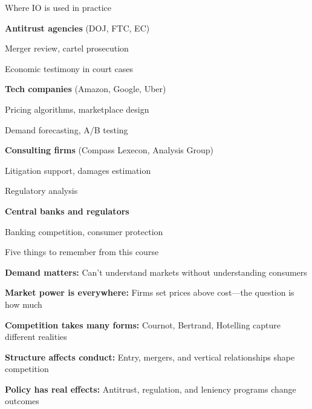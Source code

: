 \documentclass[notes,11pt, aspectratio=169]{beamer}
\newenvironment{wideitemize}{\itemize\addtolength{\itemsep}{10pt}}{\enditemize}
\newenvironment{wideenumerate}{\enumerate\addtolength{\itemsep}{10pt}}{\endenumerate}
\begin{document}
\begin{frame}{Where IO is used in practice}
	\begin{wideitemize}
		\item \textbf{Antitrust agencies} (DOJ, FTC, EC)
		\begin{wideitemize}
			\vspace{3pt}
			\item Merger review, cartel prosecution
			\item Economic testimony in court cases
		\end{wideitemize}
		\item \textbf{Tech companies} (Amazon, Google, Uber)
		\begin{wideitemize}
			\vspace{3pt}
			\item Pricing algorithms, marketplace design
			\item Demand forecasting, A/B testing
		\end{wideitemize}
		\item \textbf{Consulting firms} (Compass Lexecon, Analysis Group)
		\begin{wideitemize}
			\vspace{3pt}
			\item Litigation support, damages estimation
			\item Regulatory analysis
		\end{wideitemize}
		\item \textbf{Central banks and regulators}
		\begin{wideitemize}
			\vspace{3pt}
			\item Banking competition, consumer protection
		\end{wideitemize}
	\end{wideitemize}
\end{frame}

\begin{frame}{Five things to remember from this course}
	\begin{wideenumerate}
		\item \textbf{Demand matters:} Can't understand markets without understanding consumers
		\item \textbf{Market power is everywhere:} Firms set prices above cost---the question is how much
		\item \textbf{Competition takes many forms:} Cournot, Bertrand, Hotelling capture different realities
		\item \textbf{Structure affects conduct:} Entry, mergers, and vertical relationships shape competition
		\item \textbf{Policy has real effects:} Antitrust, regulation, and leniency programs change outcomes
	\end{wideenumerate}
\end{frame}
\end{document}

